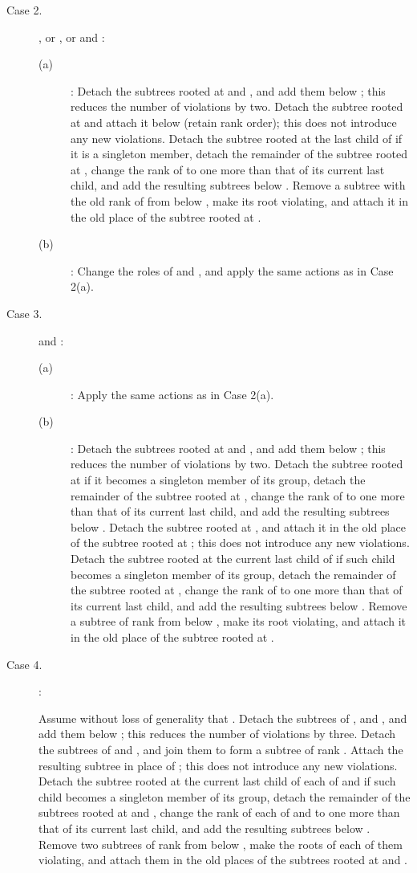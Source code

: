 \documentclass{llncs}
\begin{document}
\begin{description}
\vspace{-.1in}
\item[Case 2.] 
, or , 
or  and : 

\begin{description}
\item[(a)] : Detach the subtrees rooted at  and , and add
  them below ; this reduces the number of violations by two. 
  Detach the subtree rooted at  and attach it below  (retain rank order); this does not introduce any new violations.
  Detach the subtree rooted at the last child of  if it is a singleton member, detach the remainder of the subtree rooted at , 
  change the rank of  to one more than that of its current last child, 
  and add the resulting subtrees below . Remove a subtree with the old rank
  of  from below , make its root violating, and attach it in the old
  place of the subtree rooted at .
\item[(b)] : Change the roles of 
  and , and apply the same actions as in Case 2(a). 
\end{description}

\item[Case 3.]
 and : 

\begin{description}
\item[(a)] : Apply the same actions as in Case 2(a).
\item[(b)] : Detach the subtrees rooted at  and , and add
  them below ; this reduces the number of violations by two. 
  Detach the subtree rooted at  if it becomes a singleton member of its group, 
  detach the remainder of the subtree rooted at , 
  change the rank of  to one more than that of its current last child, 
  and add the resulting subtrees below .
  Detach the subtree rooted at , and attach it in the old place of the subtree
  rooted at ; this does not introduce any new violations. 
  Detach the subtree rooted at the current last child of  if such child becomes a singleton member of its group, 
  detach the remainder of the subtree rooted at , 
  change the rank of  to one more than that of its current last child, 
  and add the resulting subtrees below .
  Remove a subtree of rank  from below , make its root violating,
  and attach it in the old place of the subtree rooted at .
\end{description}


\item[Case 4.] :

Assume without loss of generality that .  Detach the subtrees of , and , and add them
below ; this reduces the number of violations by three.
Detach the subtrees of  and , and join them to form a
subtree of rank . Attach the resulting subtree in place of
; this does not introduce any new violations. 
Detach the subtree rooted at the current last child of each of  and 
if such child becomes a singleton member of its group,
detach the remainder of the subtrees rooted at  and , change the rank of each
of  and  to one more than that of its current last child,
and add the resulting subtrees below . Remove two subtrees of rank 
from below , make the roots of each of them violating, and attach them in the old
places of the subtrees rooted at  and .


\end{description}
\end{document}
